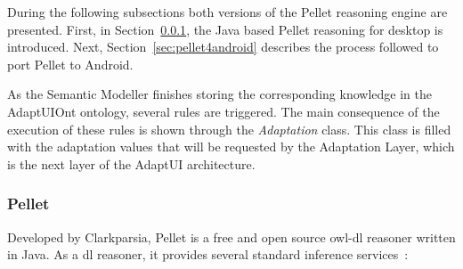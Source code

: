 During the following subsections both versions of the Pellet reasoning engine
are presented. First, in Section~\ref{sec:pellet}, the Java based Pellet reasoning
for desktop is introduced. Next, Section~\ref{sec:pellet4android} describes the
process followed to port Pellet to Android.

As the Semantic Modeller finishes storing the corresponding knowledge in the
AdaptUIOnt ontology, several rules are triggered. The main consequence of the
execution of these rules is shown through the \textit{Adaptation} class. This
class is filled with the adaptation values that will be requested by the
Adaptation Layer, which is the next layer of the AdaptUI architecture.


\subsubsection{Pellet}
\label{sec:pellet}


Developed by Clarkparsia, Pellet is a free and open source \ac{owl}-\ac{dl}
reasoner written in Java. As a \ac{dl} reasoner, it provides several standard 
inference services~\citep{pellet}:


